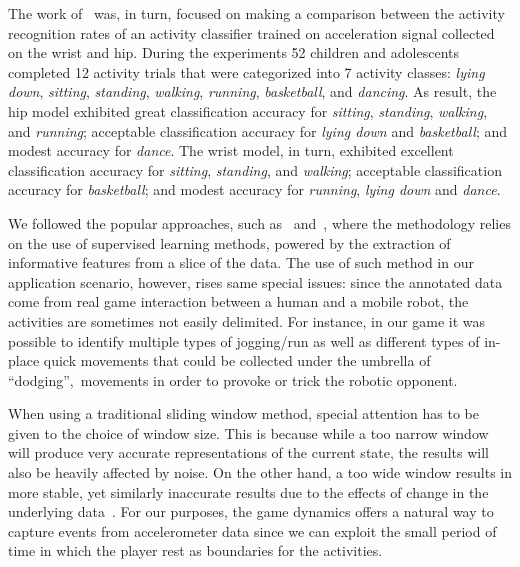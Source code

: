 The work of~\cite{trost_machine_2014} was, in turn, focused on making a comparison between the activity recognition rates of an activity classifier trained on acceleration signal collected on the wrist and hip. During the experiments 52 children and adolescents completed 12 activity trials that were categorized into 7 activity classes: \textit{lying down}, \textit{sitting}, \textit{standing}, \textit{walking}, \textit{running}, \textit{basketball}, and \textit{dancing}. As result, the hip model exhibited great classification accuracy for \textit{sitting}, \textit{standing}, \textit{walking}, and \textit{running}; acceptable classification accuracy for \textit{lying down} and \textit{basketball}; and modest accuracy for \textit{dance}. The wrist model, in turn, exhibited excellent classification accuracy for \textit{sitting}, \textit{standing}, and \textit{walking}; acceptable classification accuracy for \textit{basketball}; and modest accuracy for \textit{running}, \textit{lying down} and \textit{dance}.

We followed the popular approaches, such as~\cite{ravi_activity_2005} and~\cite{bao_activity_2004}, where the methodology relies on the use of supervised learning methods, powered by the extraction of informative features from a slice of the data. The use of such method in our application scenario, however, rises same special issues: since the annotated data come from real game interaction between a human and a mobile robot, the activities are sometimes not easily delimited. For instance, in our game it was possible to identify multiple types of jogging/run as well as different types of in-place quick movements that could be collected under the umbrella of ``dodging'',~\ie movements in order to provoke or trick the robotic opponent. 

When using a traditional sliding window method, special attention has to be given to the choice of window size. This is because while a too narrow window will produce very accurate representations of the current state, the results will also be heavily affected by noise. On the other hand, a too wide window results in more stable, yet similarly inaccurate results due to the effects of change in the underlying data~\citep{bifet_learning_2007}. For our purposes, the game dynamics offers a natural way to capture events from accelerometer data since we can exploit the small period of time in which the player rest as boundaries for the activities. 

